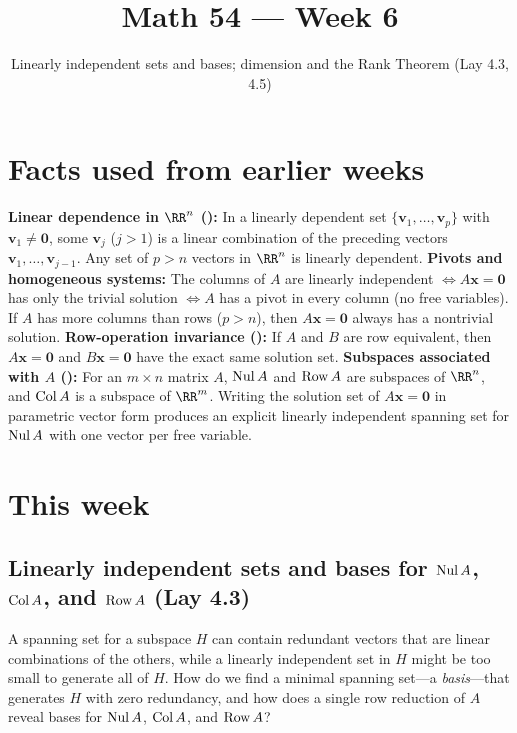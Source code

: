 \documentclass[10pt]{scrartcl}
\title{Math 54 --- Week 6}
\subtitle{Linearly independent sets and bases; dimension and the Rank Theorem (Lay 4.3, 4.5)}
\author{}\date{}\ihead{}
\newcommand{\vv}[1]{\mathbf{#1}}
\begin{document}
\maketitle

\section{Facts used from earlier weeks}
\begin{enumerate}[label=(W\arabic*),leftmargin=2.8em,itemsep=4pt]
  \ii {}\textbf{Linear dependence in $\RR^n$ ():} In a linearly dependent set $\{\vv v_1,\dots,\vv v_p\}$ with $\vv v_1\ne\vv 0$, some $\vv v_j$ ($j>1$) is a linear combination of the preceding vectors $\vv v_1,\dots,\vv v_{j-1}$. Any set of $p>n$ vectors in $\RR^n$ is linearly dependent.
  \ii {}\textbf{Pivots and homogeneous systems:} The columns of $A$ are linearly independent $\iff A\vv x=\vv 0$ has only the trivial solution $\iff A$ has a pivot in every column (no free variables). If $A$ has more columns than rows ($p>n$), then $A\vv x=\vv 0$ always has a nontrivial solution.
  \ii {}\textbf{Row-operation invariance ():} If $A$ and $B$ are row equivalent, then $A\vv x=\vv 0$ and $B\vv x=\vv 0$ have the exact same solution set.
  \ii {}\textbf{Subspaces associated with $A$ ():} For an $m\times n$ matrix $A$, $\operatorname{Nul} A$ and $\operatorname{Row} A$ are subspaces of $\RR^n$, and $\operatorname{Col} A$ is a subspace of $\RR^m$. Writing the solution set of $A\vv x=\vv 0$ in parametric vector form produces an explicit linearly independent spanning set for $\operatorname{Nul} A$ with one vector per free variable.
\end{enumerate}

\section{This week}

\subsection{Linearly independent sets and bases for $\operatorname{Nul} A$, $\operatorname{Col} A$, and $\operatorname{Row} A$ (Lay 4.3)}

\begin{qbox}
  A spanning set for a subspace $H$ can contain redundant vectors that are linear combinations of the others, while a linearly independent set in $H$ might be too small to generate all of $H$. How do we find a minimal spanning set---a \emph{basis}---that generates $H$ with zero redundancy, and how does a single row reduction of $A$ reveal bases for $\operatorname{Nul} A$, $\operatorname{Col} A$, and $\operatorname{Row} A$?
\end{qbox}
\end{document}
